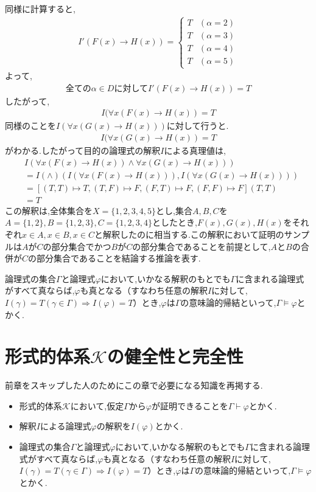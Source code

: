 \documentclass[10pt,b5paper,papersize,dvipdfmx]{jsbook}
\begin{document}
同様に計算すると,
\begin{align*}
I'(F(x)\to H(x))=
\begin{cases}
T&(\alpha = 2)\\
T&(\alpha = 3)\\
T&(\alpha = 4)\\
T&(\alpha = 5)
\end{cases}
\end{align*}
よって,
\begin{align*}
\mbox{全ての}\alpha \in D\mbox{に対して}I'(F(x)\to H(x))=T
\end{align*}
したがって,
\begin{align*}
I(\forall x(F(x)\to H(x))=T
\end{align*}
同様のことを$I(\forall x(G(x)\to H(x)))$に対して行うと.
\begin{align*}
I(\forall x(G(x)\to H(x))=T
\end{align*}
がわかる.したがって目的の論理式の解釈$I$による真理値は,
\begin{align*}
&I(\forall x(F(x)\to H(x))\land \forall x(G(x)\to H(x)))\\
&=I(\land)(I(\forall x(F(x)\to H(x))),I(\forall x(G(x)\to H(x))))\\
&=[(T,T)\mapsto T,(T,F)\mapsto F,(F,T)\mapsto F,(F,F)\mapsto F](T,T)\\
&=T
\end{align*}
この解釈は,全体集合を$X=\{1,2,3,4,5\}$とし,集合$A,B,C$を$A=\{1,2\},B=\{1,2,3\},C=\{1,2,3,4\}$としたとき,$F(x),G(x),H(x)$をそれぞれ$x\in A,x\in B,x\in C$と解釈したのに相当する.この解釈において証明のサンプルは$A$が$C$の部分集合でかつ$B$が$C$の部分集合であることを前提として,$A$と$B$の合併が$C$の部分集合であることを結論する推論を表す.\par
論理式の集合$\Gamma$と論理式$\varphi$において,いかなる解釈のもとでも$\Gamma$に含まれる論理式がすべて真ならば,$\varphi$も真となる（すなわち任意の解釈$I$に対して,$I(\gamma)=T(\gamma \in \Gamma)\Rightarrow I(\varphi)=T$）とき,$\varphi$は$\Gamma$の意味論的帰結といって,$\Gamma \models \varphi$とかく.

\section{形式的体系$\mathcal K$の健全性と完全性}
前章をスキップした人のためにこの章で必要になる知識を再掲する.
\begin{itemize}
\item 形式的体系$\mathcal K$において,仮定$\Gamma$から$\varphi$が証明できることを$\Gamma \vdash \varphi$とかく.
\item 解釈$I$による論理式$\varphi$の解釈を$I(\varphi)$とかく.
\item 論理式の集合$\Gamma$と論理式$\varphi$において,いかなる解釈のもとでも$\Gamma$に含まれる論理式がすべて真ならば,$\varphi$も真となる（すなわち任意の解釈$I$に対して,$I(\gamma)=T(\gamma \in \Gamma)\Rightarrow I(\varphi)=T$）とき,$\varphi$は$\Gamma$の意味論的帰結といって,$\Gamma \models \varphi$とかく.
\end{itemize}
\end{document}
